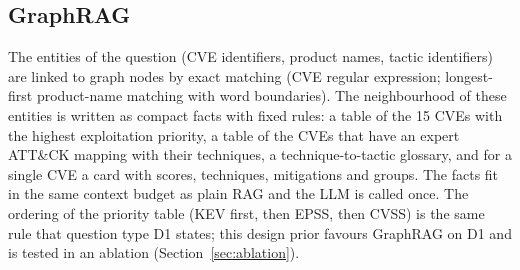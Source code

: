 \documentclass[12pt, a4paper]{article}
\newcommand{\ATTCK}{ATT\&CK}
\begin{document}
\subsection{GraphRAG}
The entities of the question (CVE identifiers, product names, tactic identifiers) are linked to graph nodes by exact matching (CVE regular expression; longest-first product-name matching with word boundaries). The neighbourhood of these entities is written as compact facts with fixed rules: a table of the 15 CVEs with the highest exploitation priority, a table of the CVEs that have an expert \ATTCK{} mapping with their techniques, a technique-to-tactic glossary, and for a single CVE a card with scores, techniques, mitigations and groups. The facts fit in the same context budget as plain RAG and the LLM is called once. The ordering of the priority table (KEV first, then EPSS, then CVSS) is the same rule that question type D1 states; this design prior favours GraphRAG on D1 and is tested in an ablation (Section~\ref{sec:ablation}).
\end{document}
